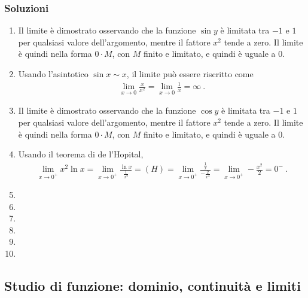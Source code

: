\documentclass[letterpaper,10pt,italian]{jupyterBook}
\begin{document}
\subsubsection*{Soluzioni}
\begin{enumerate}
%
\item {} 
\sphinxAtStartPar
Il limite è dimostrato osservando che la funzione \(\sin y\) è limitata tra \(-1\) e \(1\) per qualsiasi valore dell’argomento, mentre il fattore \(x^2\) tende a zero. Il limite è quindi nella forma \(0 \cdot M\), con \(M\) finito e limitato, e quindi è uguale a \(0\).

\item {} 
\sphinxAtStartPar
Usando l’asintotico \(\sin x \sim x\), il limite può essere riscritto come
\begin{equation*}
\begin{split}\lim_{x \to 0} \frac{x}{x^2} = \lim_{x \to 0} \frac{1}{x} = \infty \ .\end{split}
\end{equation*}
\item {} 
\sphinxAtStartPar
Il limite è dimostrato osservando che la funzione \(\cos y\) è limitata tra \(-1\) e \(1\) per qualsiasi valore dell’argomento, mentre il fattore \(x^2\) tende a zero. Il limite è quindi nella forma \(0 \cdot M\), con \(M\) finito e limitato, e quindi è uguale a \(0\).

\item {} 
\sphinxAtStartPar
Usando il teorema di de l’Hopital,
\begin{equation*}
\begin{split}\lim_{x \to 0^+} x^2 \ln x = \lim_{x \to 0^+} \frac{\ln x}{\frac{1}{x^2}} = (H) = \lim_{x \to 0^+} \frac{\frac{1}{x}}{-\frac{2}{x^3}} = \lim_{x \to 0^+} -\frac{x^2}{2} = 0^- \ .\end{split}
\end{equation*}
\item {} 
\item {} 
\item {} 
\item {} 
\item {} 
\item {} 
\end{enumerate}


\subsection{Studio di funzione: dominio, continuità e limiti}
\label{\detokenize{ch/infinitesimal_calculus/analysis-problems:studio-di-funzione-dominio-continuita-e-limiti}}\label{\detokenize{ch/infinitesimal_calculus/analysis-problems:infinitesimal-calculus-analysis-problems-funs}} \label{exercise:ch/infinitesimal_calculus/analysis-problems-exercise-7}
\end{document}
